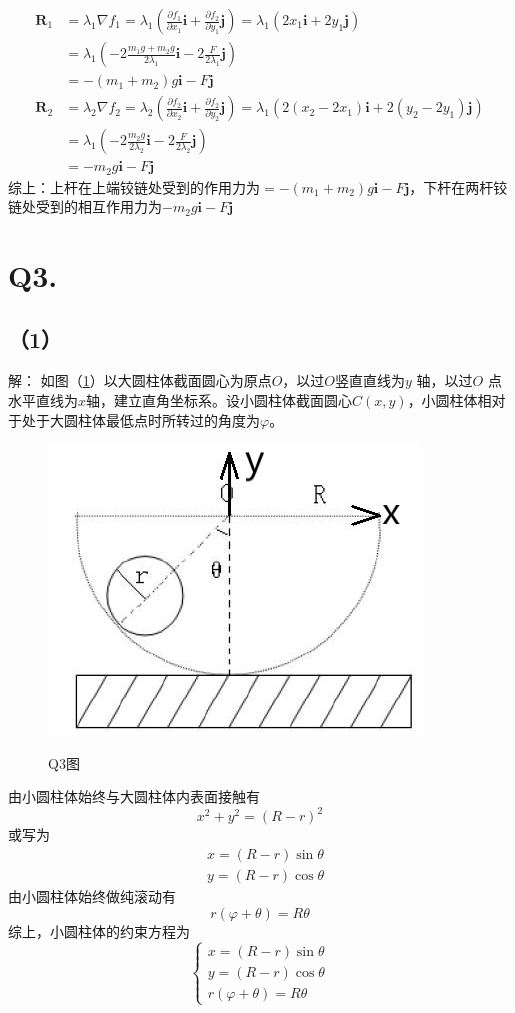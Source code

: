 \documentclass[10pt,a4paper]{article}
\begin{document}
\begin{align*}
\bm{R}_1 &= \lambda_1\nabla f_1 = \lambda_1(\frac{\partial f_1}{\partial x_1}\bm{i}+\frac{\partial f_2}{\partial y_1}\bm{j}) = \lambda_1(2x_1\bm{i}+2y_1\bm{j})\\
&= \lambda_1(-2\frac{m_1g+m_2g}{2\lambda_1}\bm{i}-2\frac{F}{2\lambda_1}\bm{j})\\
&= -(m_1+m_2)g\bm{i}-F\bm{j}\\
\bm{R}_2 &= \lambda_2\nabla f_2 = \lambda_2(\frac{\partial f_2}{\partial x_2}\bm{i}+\frac{\partial f_2}{\partial y_2}\bm{j}) = \lambda_1(2(x_2-2x_1)\bm{i}+2(y_2-2y_1)\bm{j})\\
&= \lambda_1(-2\frac{m_2g}{2\lambda_2}\bm{i}-2\frac{F}{2\lambda_2}\bm{j})\\
&= -m_2g\bm{i}-F\bm{j}
\end{align*}
综上：上杆在上端铰链处受到的作用力为$= -(m_1+m_2)g\bm{i}-F\bm{j}$，下杆在两杆铰链处受到的相互作用力为$-m_2g\bm{i}-F\bm{j}$
\section*{Q3.}
\subsection*{（1）}解：
如图（\ref{FigureofHomework_4_Q3}）以大圆柱体截面圆心为原点$O$，以过$O$竖直直线为$y$ 轴，以过$O$ 点水平直线为$x$轴，建立直角坐标系。设小圆柱体截面圆心$C(x,y)$，小圆柱体相对于处于大圆柱体最低点时所转过的角度为$\varphi$。
\begin{figure}[h]
\centering
\includegraphics[scale=.5]{FigureofHomework_4_Q3.jpg}\\
\caption{Q3图}\label{FigureofHomework_4_Q3}
\end{figure}

由小圆柱体始终与大圆柱体内表面接触有
\[
x^2+y^2 = (R-r)^2
\]
或写为
\begin{align*}
&x = (R-r)\sin\theta\\
&y = (R-r)\cos\theta
\end{align*}
由小圆柱体始终做纯滚动有
\[
r(\varphi+\theta) = R\theta
\]
综上，小圆柱体的约束方程为
\[
\left\{\begin{array}{lll}
x = (R-r)\sin\theta\\
y = (R-r)\cos\theta\\
r(\varphi+\theta) = R\theta
\end{array}\right.
\]
\end{document}
